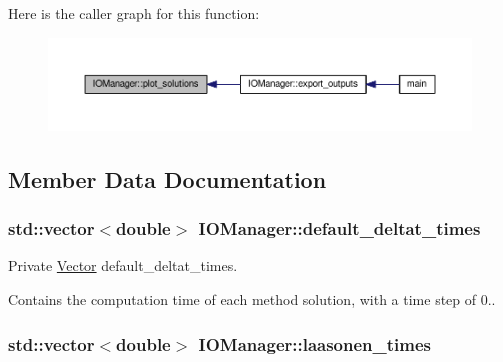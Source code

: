 Here is the caller graph for this function\+:
\nopagebreak
\begin{figure}[H]
\begin{center}
\leavevmode
\includegraphics[width=350pt]{classIOManager_a149183e073e33890810fe6801bc4861f_icgraph}
\end{center}
\end{figure}




\subsection{Member Data Documentation}
\subsubsection[{\texorpdfstring{default\+\_\+deltat\+\_\+times}{default_deltat_times}}]{\setlength{\rightskip}{0pt plus 5cm}std\+::vector$<$double$>$ I\+O\+Manager\+::default\+\_\+deltat\+\_\+times\hspace{0.3cm}{\ttfamily [private]}}\hypertarget{classIOManager_a30696a7aaed227e80b3bbac567943eb0}{}\label{classIOManager_a30696a7aaed227e80b3bbac567943eb0}


Private \hyperlink{classVector}{Vector} default\+\_\+deltat\+\_\+times. 

Contains the computation time of each method solution, with a time step of 0.. 
\subsubsection[{\texorpdfstring{laasonen\+\_\+times}{laasonen_times}}]{\setlength{\rightskip}{0pt plus 5cm}std\+::vector$<$double$>$ I\+O\+Manager\+::laasonen\+\_\+times\hspace{0.3cm}{\ttfamily [private]}}\hypertarget{classIOManager_a55739efc2d1c63b7b0c0afe2db6b294b}{}\label{classIOManager_a55739efc2d1c63b7b0c0afe2db6b294b}


